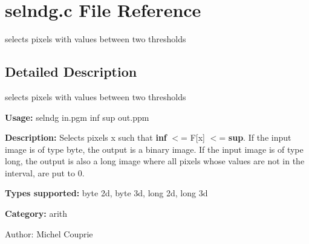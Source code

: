 \section{selndg.c File Reference}
\label{selndg_8c}
selects pixels with values between two thresholds  




\label{_details}
\subsection{Detailed Description}
selects pixels with values between two thresholds 

{\bf Usage:} selndg in.pgm inf sup out.ppm

{\bf Description:} Selects pixels x such that {\bf inf} $<$= F[x] $<$= {\bf sup}. If the input image is of type byte, the output is a binary image. If the input image is of type long, the output is also a long image where all pixels whose values are not in the interval, are put to 0.

{\bf Types supported:} byte 2d, byte 3d, long 2d, long 3d

{\bf Category:} arith

\begin{Desc}
\item[Author:]Michel Couprie \end{Desc}
